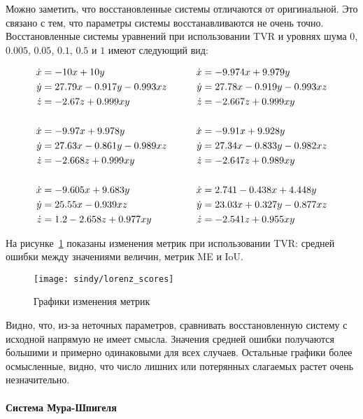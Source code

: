 Можно заметить, что восстановленные системы отличаются от оригинальной. Это связано с тем, что параметры системы восстанавливаются не очень точно. Восстановленные системы уравнений при использовании TVR и уровнях шума $0$, $0.005$, $0.05$, $0.1$, $0.5$ и $1$ имеют следующий вид:

\begin{equation}
\normalspacing
\begin{aligned}
\dot{x} &= -10 x + 10 y                  &\dot{x} &= -9.974 x + 9.979 y \\
\dot{y} &= 27.79 x - 0.917 y - 0.993 x z \qquad &\dot{y} &= 27.78 x - 0.919 y - 0.993 x z \\
\dot{z} &= -2.67 z + 0.999 x y           &\dot{z} &= -2.667 z + 0.999 x y \\
\\
\dot{x} &= -9.97 x + 9.978 y             &\dot{x} &= -9.91 x + 9.928 y \\
\dot{y} &= 27.63 x - 0.861 y - 0.989 x z &\dot{y} &= 27.34 x - 0.833 y - 0.982 x z \\
\dot{z} &= -2.668 z + 0.999 x y          &\dot{z} &= -2.647 z + 0.989 x y \\
\\
\dot{x} &= -9.605 x + 9.683 y        &\dot{x} &= 2.741 - 0.438 x + 4.448 y \\
\dot{y} &= 25.55 x - 0.939 x z       &\dot{y} &= 23.03 x + 0.327 y - 0.877 x z \\
\dot{z} &= 1.2 - 2.658 z + 0.977 x y &\dot{z} &= -2.541 z + 0.955 x y
\end{aligned}
\end{equation}

На рисунке~\ref{fig:lorenz:scores} показаны изменения метрик при использовании TVR: средней ошибки между значениями величин, метрик ME и IoU.

\begin{figure}
\texttt{[image: sindy/lorenz\_scores]}
\caption{Графики изменения метрик}
\label{fig:lorenz:scores}
\end{figure}

Видно, что, из-за неточных параметров, сравнивать восстановленную систему с исходной напрямую не имеет смысла. Значения средней ошибки получаются большими и примерно одинаковыми для всех случаев. Остальные графики более осмысленные, видно, что число лишних или потерянных слагаемых растет очень незначительно.

\paragraph{Система Мура-Шпигеля}

